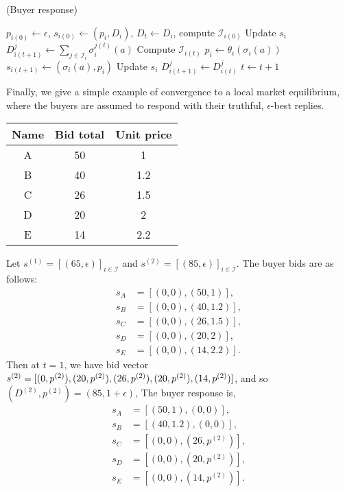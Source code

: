 \documentclass[sigconf, anonymous]{acmart}
\newcommand{\mcI}{\mathcal{I}}
\newcommand{\g}{\sigma}
\theoremstyle{definition}
\begin{document}
\begin{center}
\begin{algorithm}[H]
\caption{(Buyer response)}
\begin{algorithmic}[1]
\State $p_{i(0)} \gets \epsilon$, $s_{i(0)} \gets (p_i, D_i)$, $D_t \gets D_i$, compute
$\mcI_{i(0)}$
\State Update $s_i$ 
\State $D_{i(t+1)}^j \gets \sum_{j\in\mcI_i}\g_i^{j(t)}(a)$
    \State Compute $\mcI_{i(t)}$
    \State $p_i \gets \theta_i(\g_i(a))$
\EndIf
\State $s_{i(t+1)} \gets (\g_i(a), p_i)$
\State Update $s_i$
\State $D_{i(t+1)}^j \gets D_{i(t)}^j$
\State $t \gets t+1$
\EndWhile
\end{algorithmic}
\end{algorithm}
\end{center}
Finally, we give a simple example of convergence to a local market equilibrium,
where the buyers are assumed to respond with their truthful,
$\epsilon$-best replies.
\begin{center}
\begin{tabular}{c|c|c}
Name & Bid total & Unit price\\
\hline
A & 50 & 1\\ 
B & 40 & 1.2\\
C & 26 & 1.5\\
D & 20 & 2\\
E & 14 & 2.2
\end{tabular}
\end{center}
Let $s^{(1)} = [(65,\epsilon)]_{i\in\mcI}$ and
$s^{(2)}=[(85,\epsilon)]_{i\in\mcI}$. The buyer bids are as follows: 
\begin{align*}
    s_A &= [(0,0), (50,1)], \\
    s_B &= [(0,0), (40,1.2)], \\
    s_C &= [(0,0),(26,1.5)], \\
    s_D &= [(0,0),(20,2)], \\
    s_E &= [(0,0), (14,2.2)]. 
\end{align*}
Then at $t=1$, we have 
bid vector $s^{(2)}=[(0,p^{(2)}), (20,p^{(2)}), (26,p^{(2)}),\\ (20,p^{(2)}),
(14,p^{(2)})]$, and so  $(D^{(2)},p^{(2)}) = (85, 1+\epsilon)$, The buyer response is,
\begin{align*}
    s_A &= [(50,1), (0,0)], \\
    s_B &= [(40,1.2), (0,0)], \\
    s_C &= [(0,0),(26,p^{(2)})], \\
    s_D &= [(0,0),(20,p^{(2)})], \\
    s_E &= [(0,0),(14,p^{(2)})].
\end{align*}
\end{document}
